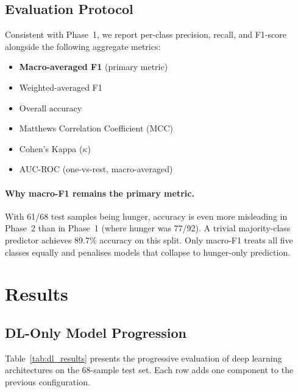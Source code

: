 \documentclass[11pt,a4paper]{article}
\begin{document}
\subsection{Evaluation Protocol}
\label{sec:eval_protocol}

Consistent with Phase~1, we report per-class precision, recall, and
F1-score alongside the following aggregate metrics:
\begin{itemize}[nosep]
  \item \textbf{Macro-averaged F1} (primary metric)
  \item Weighted-averaged F1
  \item Overall accuracy
  \item Matthews Correlation Coefficient (MCC)
  \item Cohen's Kappa ($\kappa$)
  \item AUC-ROC (one-vs-rest, macro-averaged)
\end{itemize}

\paragraph{Why macro-F1 remains the primary metric.}
With 61/68 test samples being hunger, accuracy is even more misleading
in Phase~2 than in Phase~1 (where hunger was 77/92). A trivial
majority-class predictor achieves 89.7\% accuracy on this split. Only
macro-F1 treats all five classes equally and penalises models that
collapse to hunger-only prediction.

\section{Results}
\label{sec:results}

\subsection{DL-Only Model Progression}

Table~\ref{tab:dl_results} presents the progressive evaluation of deep
learning architectures on the 68-sample test set. Each row adds one
component to the previous configuration.
\end{document}
